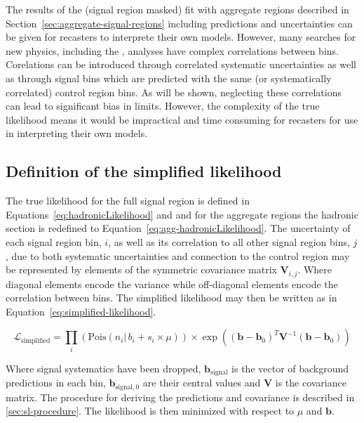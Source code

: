 The results of the (signal region masked) fit with aggregate regions described
in Section~\ref{sec:aggregate-signal-regions} including predictions
and uncertainties can be given for recasters to interprete their own
models. However, many searches for new physics, including the \alphat,
analyses have complex correlations between bins. Corelations 
can be introduced through correlated systematic uncertainties as well as 
through signal bins which are predicted with the same (or systematically
correlated) control region bins. As will be shown, neglecting these 
correlations can lead to significant bias in limits. However,
the complexity of the true likelihood means it would be impractical
and time consuming for recasters for use in interpreting their own models.


\subsection{Definition of the simplified likelihood}
\label{sec:sl-definition}
The true likelihood for the full signal region is defined in Equations~\ref{eq:hadronicLikelihood}
and \label{eq:controlLikelihood} and for the aggregate regions the 
hadronic section is redefined to Equation~\ref{eq:agg-hadronicLikelihood}. The uncertainty
of each signal region bin, $i$, as well as its correlation to all other signal region bins, $j$, 
due to both systematic uncertainties and connection to the control region may be represented
by elements of the symmetric covariance matrix $\mathbf{V}_{i,j}$. Where diagonal elements encode the 
variance while off-diagonal elements encode the correlation between bins. The simplified likelihood
may then be written as in Equation~\ref{eq:simplified-likelihood}.

\begin{equation}
\mathcal{L}_{\mathrm{simplified}}=\prod_i(\mathrm{Pois}(n_{i} |\, b_{i} + s_{i}\times\mu)
)\times\exp((\mathbf{b}-\mathbf{b}_{0})^T\mathbf{V}^{-1}(\mathbf{b}-\mathbf{b}_{0}))
\label{eq:simplified-likelihood}
\end{equation}

Where signal systematics have been dropped, $\mathbf{b}_{\mathrm{signal}}$ is the vector
of background predictions in each bin, $\mathbf{b}_{\mathrm{signal},0}$ are their central values 
and $\mathbf{V}$ is the covariance matrix. The procedure for deriving the predictions and covariance
is described in \ref{sec:sl-procedure}. The likelihood is then minimized with respect to $\mu$ and $\mathbf{b}$.

